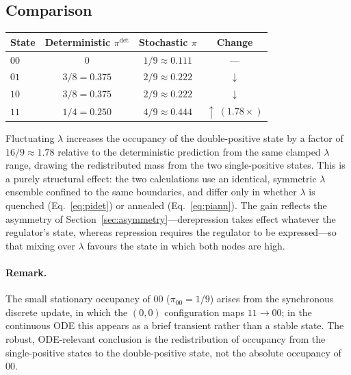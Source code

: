 \subsection{Comparison}
 
\begin{center}
\begin{tabular}{lccc}
\toprule
State & Deterministic $\pi^{\det}$ & Stochastic $\pi$ & Change \\
\midrule
$00$ & $0$            & $1/9\approx0.111$ & --- \\
$01$ & $3/8 = 0.375$  & $2/9\approx0.222$ & $\downarrow$ \\
$10$ & $3/8 = 0.375$  & $2/9\approx0.222$ & $\downarrow$ \\
$11$ & $1/4 = 0.250$  & $4/9\approx0.444$ & $\uparrow\ (1.78\times)$ \\
\bottomrule
\end{tabular}
\end{center}
 
Fluctuating $\lambda$ increases the occupancy of the double-positive state by a
factor of $16/9\approx1.78$ relative to the deterministic prediction from the
same clamped $\lambda$ range, drawing the redistributed mass from the two
single-positive states. This is a purely structural effect: the two calculations
use an identical, symmetric $\lambda$ ensemble confined to the same boundaries,
and differ only in whether $\lambda$ is quenched (Eq.~\eqref{eq:pidet}) or
annealed (Eq.~\eqref{eq:piann}). The gain reflects the asymmetry of
Section~\ref{sec:asymmetry}---derepression takes effect whatever the regulator's
state, whereas repression requires the regulator to be expressed---so that mixing
over $\lambda$ favours the state in which both nodes are high.
 
\paragraph{Remark.} The small stationary occupancy of $00$
($\pi_{00}=1/9$) arises from the synchronous discrete update, in which the
$(0,0)$ configuration maps $11\!\to\!00$; in the continuous ODE this appears as a
brief transient rather than a stable state. The robust, ODE-relevant conclusion
is the redistribution of occupancy from the single-positive states to the
double-positive state, not the absolute occupancy of $00$.
 

